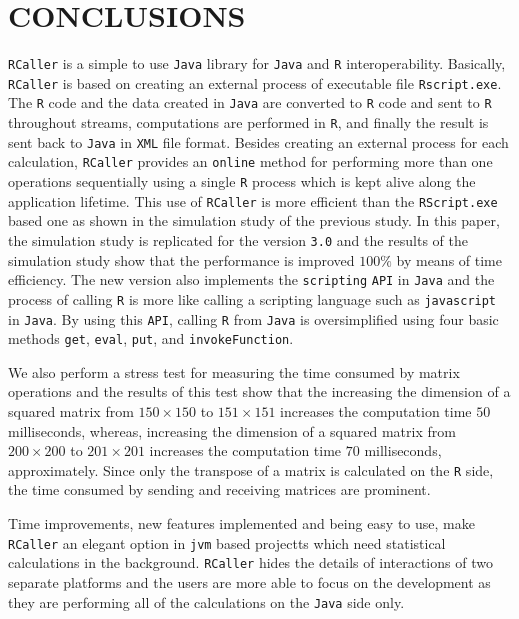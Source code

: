 \documentclass[10pt,a4paper, final, oneside]{article}
\begin{document}



\section{CONCLUSIONS}
\label{sec:conclusion}
\texttt{RCaller} is a simple to use \texttt{Java} library for \texttt{Java} and \texttt{R} interoperability.
Basically, \texttt{RCaller} is based on creating an external process of executable file \texttt{Rscript.exe}. The \texttt{R} code and the data created in \texttt{Java} are converted to \texttt{R} code and sent to \texttt{R} throughout streams, computations are performed in \texttt{R}, and finally the result is sent back to \texttt{Java} in \texttt{XML} file format. Besides creating an external process for each calculation, \texttt{RCaller} provides an \texttt{online} method for performing more than one operations sequentially using a single \texttt{R} process which is kept alive along the application lifetime. This use of \texttt{RCaller} is more efficient than the \texttt{RScript.exe} based one as shown in the simulation study of the previous study. In this paper, the simulation study is replicated for the version \texttt{3.0} and the results of the simulation study show that the performance is improved $100\%$ by means of time efficiency. The new version also implements the \texttt{scripting} \texttt{API} in \texttt{Java} and the process of calling \texttt{R} is more like calling a scripting language such as \texttt{javascript} in \texttt{Java}. By using this \texttt{API}, calling \texttt{R} from \texttt{Java} is oversimplified using four basic methods \texttt{get}, \texttt{eval}, \texttt{put}, and \texttt{invokeFunction}. 

We also perform a stress test for measuring the time consumed by matrix operations and the results of this test show that the increasing the dimension of a squared matrix from $150 \times 150$ to $151 \times 151$ increases the computation time $50$ milliseconds, whereas, increasing the dimension of a squared matrix from $200 \times 200$ to $201 \times 201$ increases the computation time $70$ milliseconds, approximately. Since only the transpose of a matrix is calculated on the \texttt{R} side, the time consumed by sending and receiving matrices are prominent. 

Time improvements, new features implemented and being easy to use, make \texttt{RCaller} an elegant option in \texttt{jvm} based projectts which need statistical calculations in the background. \texttt{RCaller} hides the details of interactions of two separate platforms and the users are more able to focus on the development as they are performing all of the calculations on the \texttt{Java} side only.
\end{document}
